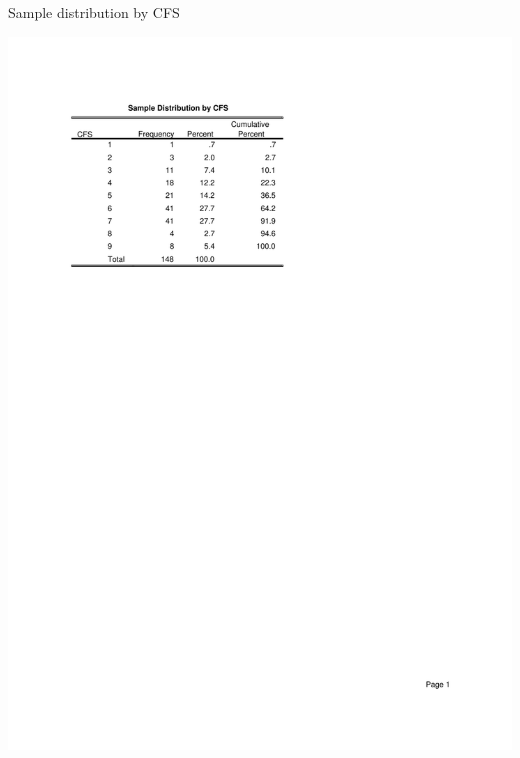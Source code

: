 \documentclass
[
	12pt,
	a4paper,
	oneside,
]{report}
\begin{document}
\begin{table}[ht]
\caption{Sample distribution by CFS}
\label{tab:dist-cfs}
\includegraphics[width=\textwidth,
	trim={2.5cm 14cm 2.5cm 2.5cm},
	clip]{media/dist-cfs}
\end{table}
\end{document}
